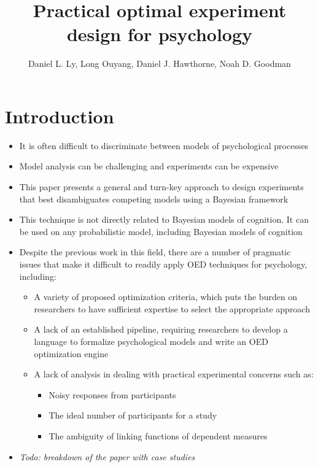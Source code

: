 \documentclass[11pt]{article}
\title{Practical optimal experiment design for psychology}
\author{Daniel L. Ly, Long Ouyang, Daniel J. Hawthorne, Noah D. Goodman}
\date{}
\begin{document}
\maketitle

\begin{abstract}
\lipsum[1]
\end{abstract}

\section{Introduction}
    \begin{itemize}
        \item It is often difficult to discriminate between models of psychological processes
        \item Model analysis can be challenging and experiments can be expensive
        \item This paper presents a general and turn-key approach to design experiments that best disambiguates competing models using a Bayesian framework
        \item This technique is not directly related to Bayesian models of cognition. It can be used on any probabilistic model, including Bayesian models of cognition
        \item Despite the previous work in this field, there are a number of pragmatic issues that make it difficult to readily apply OED techniques for psychology, including:
        \begin{itemize}
            \item A variety of proposed optimization criteria, which puts the burden on researchers to have sufficient expertise to select the appropriate approach
            \item A lack of an established pipeline, requiring researchers to develop a language to formalize psychological models and write an OED optimization engine
            \item A lack of analysis in dealing with practical experimental concerns such as:
                \begin{itemize}
                    \item Noisy responses from participants
                    \item The ideal number of participants for a study
                    \item The ambiguity of linking functions of dependent measures
                \end{itemize}
        \end{itemize}
        \item \emph{Todo: breakdown of the paper with case studies}
    \end{itemize}
\end{document}
